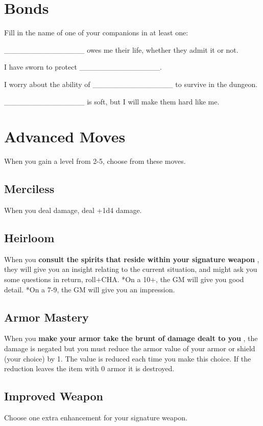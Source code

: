 \section{Bonds}


 Fill in the name of one of your companions in at least one:


 \_\_\_\_\_\_\_\_\_\_\_\_\_\_\_ owes me their life, whether they admit it or not.


 I have sworn to protect \_\_\_\_\_\_\_\_\_\_\_\_\_\_\_.


 I worry about the ability of \_\_\_\_\_\_\_\_\_\_\_\_\_\_\_ to survive in the dungeon.


 \_\_\_\_\_\_\_\_\_\_\_\_\_\_\_ is soft, but I will make them hard like me.
\section{Advanced Moves}


 {\Large When you gain a level from 2-5, choose from these moves.}
\subsection{Merciless}


 When you deal damage, deal +1d4 damage.
\subsection{Heirloom}


 When you \textbf{consult the spirits that reside within your signature weapon}
, they will give you an insight relating to the current situation, and might ask you some questions in return, roll+CHA. *On a 10+, the GM will give you good detail. *On a 7-9, the GM will give you an impression.
\subsection{Armor Mastery}


 When you \textbf{make your armor take the brunt of damage dealt to you}
, the damage is negated but you must reduce the armor value of your armor or shield (your choice) by 1. The value is reduced each time you make this choice. If the reduction leaves the item with 0 armor it is destroyed.
\subsection{Improved Weapon}


 Choose one extra enhancement for your signature weapon.
